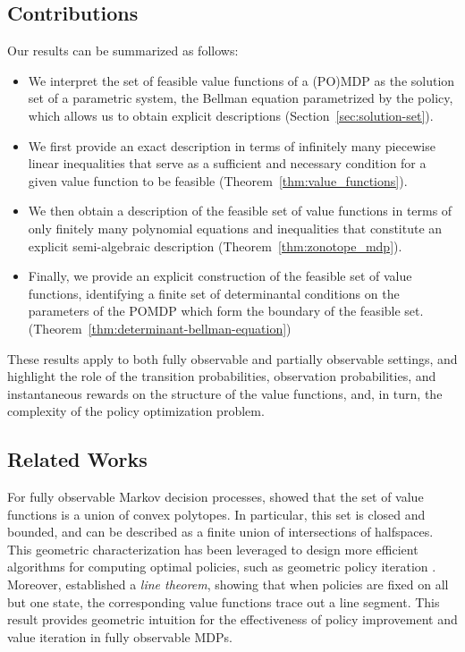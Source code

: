 \documentclass{article}
\theoremstyle{definition}
\theoremstyle{remark}
\begin{document}
\subsection{Contributions} 
%
Our results can be summarized as follows: 
%
\begin{itemize}[leftmargin=*]
    \item We interpret the set of feasible value functions of a (PO)MDP as the solution set of a parametric system, 
    the Bellman equation parametrized by the policy, 
    which allows us to obtain explicit descriptions (Section~\ref{sec:solution-set}). 
    
    \item We first provide an exact description in terms of infinitely many piecewise linear inequalities that serve as a sufficient and necessary condition for a given value function to be feasible (Theorem~\ref{thm:value_functions}). 
    
    \item  We then obtain a description of the feasible set of value functions in terms of only finitely many polynomial equations and inequalities that constitute an explicit semi-algebraic description (Theorem~\ref{thm:zonotope_mdp}).  
    
    \item  Finally, we provide an explicit construction of the feasible set of value functions, identifying a finite set of determinantal conditions on the parameters of the POMDP which form the boundary of the feasible set. (Theorem~\ref{thm:determinant-bellman-equation})
\end{itemize} 

These results apply to both fully observable and partially observable settings, and highlight the role of the transition probabilities, observation probabilities, and instantaneous rewards on the structure of the value functions, and, in turn, the complexity of the policy optimization problem. 


\subsection{Related Works}

For fully observable Markov decision processes, \citet{dadashiValueFunctionPolytope2019} showed that the set of value functions is a union of convex polytopes. In particular, this set is closed and bounded, and can be described as a finite union of intersections of halfspaces. 
This geometric characterization has been leveraged to design more efficient algorithms for computing optimal policies, such as geometric policy iteration \citep{wuGeometricPolicyIteration2022a}. 
%
Moreover, \citet{dadashiValueFunctionPolytope2019} established a \emph{line theorem}, showing that when policies are fixed on all but one state, the corresponding value functions trace out a line segment. This result provides geometric intuition for the effectiveness of policy improvement and value iteration in fully observable MDPs. 
\end{document}
